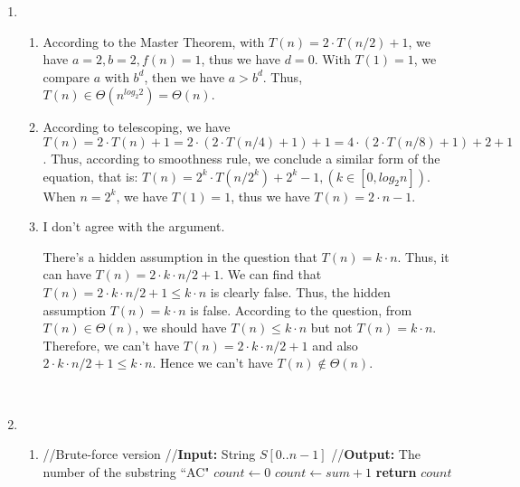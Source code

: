 \documentclass[11pt]{article}
\begin{document}
\begin{enumerate}
\item

\begin{enumerate}
\item
According to the Master Theorem, with $T(n)=2\cdot T(n/2)+1$, we have $a=2, b=2, f(n)=1$, thus we have $d=0$. With $T(1)=1$, we compare $a$ with $b^d$, then we have $a>b^d$. Thus, $T(n) \in \Theta(n^{log_2 2})=\Theta(n)$.

\item
According to telescoping, we have $T(n)=2\cdot T(n)+1=2\cdot (2\cdot T(n/4)+1)+1=4\cdot (2\cdot T(n/8)+1)+2+1$. Thus, according to smoothness rule, we conclude a similar form of the equation, that is: $T(n)=2^k\cdot T(n/2^k)+2^k-1, (k \in [0, {log_2 n}])$. When $n=2^k$, we have $T(1)=1$, thus we have $T(n)=2\cdot n-1$.
\item
I don't agree with the argument.

There's a hidden assumption in the question that $T(n)=k\cdot n$. Thus, it can have $T(n)=2\cdot k \cdot n/2+1$. We can find that $T(n)=2\cdot k \cdot n/2+1 \leq k \cdot n$ is clearly false. Thus, the hidden assumption $T(n)=k\cdot n$ is false. According to the question, from $T(n)\in \Theta(n)$, we should have $T(n)\leq k\cdot n$ but not $T(n)=k\cdot n$. Therefore, we can't have $T(n)=2\cdot k \cdot n/2+1$ and also $2\cdot k \cdot n/2+1 \leq k\cdot n$. Hence we can't have $T(n)\notin \Theta(n)$.
~
\end{enumerate}
~
\item
\begin{enumerate}
\item
\begin{algorithmic}[1]
	\State //Brute-force version
	\State //\textbf{Input:} String $S[0..n-1]$
	\State //\textbf{Output:} The number of the substring \textquotedblleft AC"
	\State $count\gets 0$
					\State $count\gets sum+1$
				\EndIf
			\EndFor
		\EndIf
	\EndFor
	\State \textbf{return} $count$
\EndFunction
\end{algorithmic}
~



\end{enumerate}
\end{enumerate}
\end{document}
